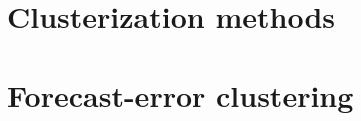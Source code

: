 \documentclass[c, dvipsnames]{beamer}  %
\begin{document}
%
%
%
%
%
%
%
%
%	
%	
%	
%	
%	
%	
%	
%	
%	
%	
% 
%
%
%
%
%


%
%
%
%
%
%
%
%
%
%
%
%




\section{Clusterization methods}

\section{Forecast-error clustering}
\end{document}
